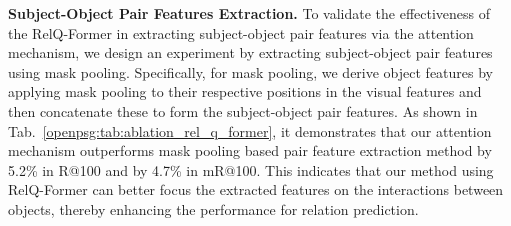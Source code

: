 \begin{table}[t]\small
    \centering
    \caption{Ablation study of comparison of different segmenters.}
    \label{openpsg:tab:segmenter}
\end{table}


\noindent \textbf{Subject-Object Pair Features Extraction.}
To validate the effectiveness of the RelQ-Former in extracting subject-object pair features via the attention mechanism, we design an experiment by extracting subject-object pair features using mask pooling.
Specifically, for mask pooling, we derive object features by applying mask pooling to their respective positions in the visual features and then concatenate these to form the subject-object pair features.
As shown in Tab.~\ref{openpsg:tab:ablation_rel_q_former}, it demonstrates that our attention mechanism outperforms mask pooling based pair feature extraction method by 5.2\% in R@100 and by 4.7\% in mR@100.
This indicates that our method using RelQ-Former can better focus the extracted features on the interactions between objects, thereby enhancing the performance for relation prediction.



